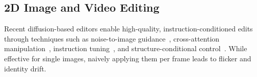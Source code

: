 

\subsection{2D Image and Video Editing}
Recent diffusion-based editors enable high-quality, instruction-conditioned edits through techniques such as noise-to-image guidance~\cite{meng2022sdeditguidedimagesynthesis}, cross-attention manipulation~\cite{hertz2022prompttopromptimageeditingcross}, instruction tuning~\cite{ip2p}, and structure-conditional control~\cite{controlnet}. While effective for single images, naively applying them per frame leads to flicker and identity drift.


